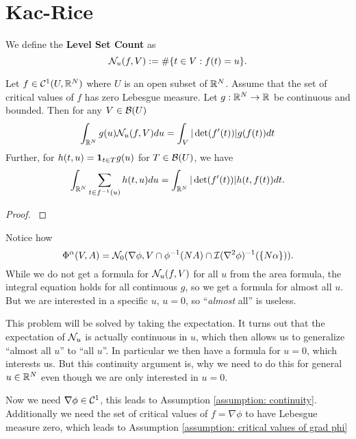 \section{Kac-Rice}

We define the \textbf{Level Set Count} as
\[
	\level(f, \Vol) := \#\{t\in \Vol : f(t) = u\}.
\]

\begin{prop}
	Let \(f\in\contin^1(U, \real^\dimension)\) where \(U\) is an open
	subset of \(\real^\dimension\). Assume that the set of critical values of
	\(f\) has zero Lebesgue measure. Let \(g: \real^\dimension\to\real\) be
	continuous and bounded. Then for any \(\Vol\in\borel(U)\)
	\[
		\int_{\real^\dimension}g(u) \level(f, \Vol)du
		= \int_\Vol |\det(f'(t))| g(f(t))dt
	\]
	Further, for \(h(t,u) = \ind_{t\in T} g(u)\) for \(T\in\borel(U)\), we have
	\[
		\int_{\real^\dimension} \sum_{t\in f^{-1}(u)} h(t, u)du
		= \int_{\real^\dimension} |\det(f'(t))| h(t, f(t))dt.
	\]
\end{prop}
\begin{proof}
	\textcite[pp. 120]{azaisLevelSetsExtrema2009}
\end{proof}

Notice how
\begin{equation}\label{eq: level set and crit point relation}
	\crit^\alpha(\Vol, A)
	= \level[0](
		\nabla\rf,
		\Vol
		\cap \rf^{-1}(\dimension A)
		\cap \negEV(\nabla^2\rf)^{-1}(\{\dimension\alpha\})
	).
\end{equation}
While we do not get a formula for \(\level(f,\Vol)\) for all \(u\) from the area
formula, the integral equation holds for all continuous \(g\), so we get a
formula for almost all \(u\). But we are interested in a specific \(u\), \(u=0\),
so ``\emph{almost} all'' is useless.

This problem will be solved by taking the expectation. It turns out that
the expectation of \(\level\) is actually continuous in \(u\), which then allows
us to generalize ``almost all \(u\)'' to ``all \(u\)''. In particular we then
have a formula for \(u=0\), which interests us. But this continuity argument is,
why we need to do this for general \(u\in\real^\dimension\) even though we are
only interested in \(u=0\).

Now we need \(\nabla \phi \in \contin^1\), this leads to Assumption
\ref{assumption: continuity}.  Additionally we need the set of critical values
of \(f=\nabla\phi\) to have
Lebesgue measure zero, which leads to Assumption \ref{assumption: critical
values of grad phi}


